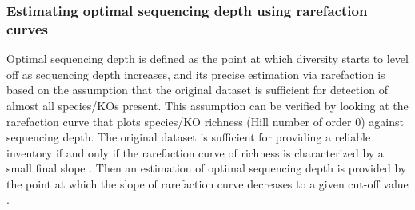 \documentclass[11pt]{article}
\begin{document}
      \subsubsection{Estimating optimal sequencing depth using rarefaction curves} 
      Optimal sequencing depth is defined as the point at which diversity starts to level off as sequencing depth increases, and its precise estimation via rarefaction is based on the assumption that the original dataset is sufficient for detection of almost all species/KOs present. 
      This assumption can be verified by looking at the rarefaction curve that plots species/KO richness (Hill number of order 0) against sequencing depth. 
      The original dataset is sufficient for providing a reliable inventory if and only if the rarefaction curve of richness is characterized by a small final slope \citep{heck1975explicit,hortal2005ed,chao2012coverage}. 
      Then an estimation of optimal sequencing depth is provided by the point at which the slope of rarefaction curve decreases to a given cut-off value \citep{hortal2005ed,gomez2014using}. 
    
\end{document}
